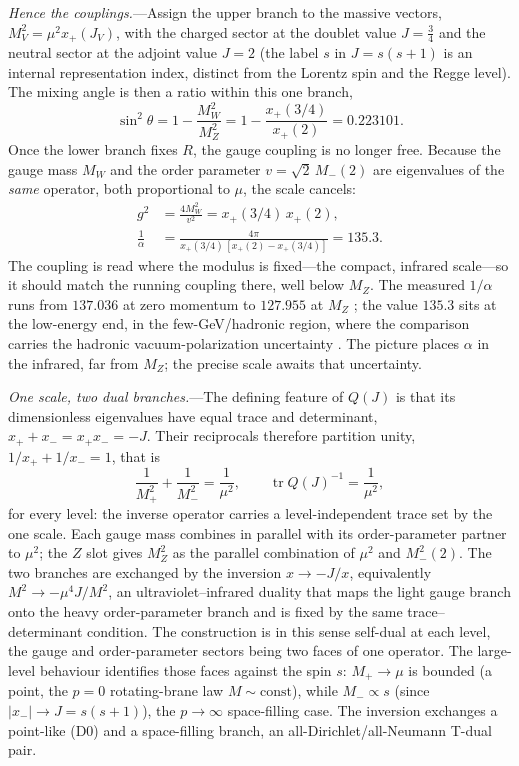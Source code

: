 \documentclass[aps,prl,reprint,superscriptaddress,nofootinbib]{revtex4-2}
\begin{document}
\textit{Hence the couplings.}---Assign the upper branch to the massive vectors,
$M_V^2=\mu^2x_+(J_V)$, with the charged sector at the doublet value $J=\tfrac34$ and the neutral sector
at the adjoint value $J=2$ (the label $s$ in $J=s(s+1)$ is an internal
representation index, distinct from the Lorentz spin and the Regge level). The mixing
angle is then a ratio within this one branch,
\begin{equation}
\sin^2\theta=1-\frac{M_W^2}{M_Z^2}=1-\frac{x_+(3/4)}{x_+(2)}=0.223101 .
\label{eq:sin2}
\end{equation}
Once the lower branch fixes $R$, the gauge coupling is no longer free. Because
the gauge mass $M_W$ and the order parameter $v=\sqrt2\,M_-(2)$ are eigenvalues
of the \emph{same} operator, both proportional to $\mu$, the scale cancels:
\begin{align}
g^2&=\frac{4M_W^2}{v^2}=x_+(3/4)\,x_+(2),\nonumber\\
\frac1\alpha&=\frac{4\pi}{x_+(3/4)\,[x_+(2)-x_+(3/4)]}=135.3 .
\label{eq:alpha}
\end{align}
The coupling is read where the modulus is fixed---the compact, infrared
scale---so it should match the running coupling there, well below $M_Z$. The measured
$1/\alpha$ runs from $137.036$ at zero momentum to $127.955$ at $M_Z$
\cite{PDG2025}; the value $135.3$ sits at the low-energy end, in the
few-GeV/hadronic region, where the comparison carries the hadronic
vacuum-polarization uncertainty \cite{Jegerlehner2019}. The picture places
$\alpha$ in the infrared, far from $M_Z$; the precise scale awaits that
uncertainty.

\textit{One scale, two dual branches.}---The defining feature of $Q(J)$ is that
its dimensionless eigenvalues have equal trace and determinant,
$x_++x_-=x_+x_-=-J$. Their reciprocals therefore partition unity,
$1/x_++1/x_-=1$, that is
\begin{equation}
\frac{1}{M_+^2}+\frac{1}{M_-^2}=\frac1{\mu^2},
\qquad
\operatorname{tr}Q(J)^{-1}=\frac1{\mu^2},
\label{eq:reciprocal}
\end{equation}
for every level: the inverse operator carries a level-independent trace set by
the one scale. Each gauge mass combines in parallel with its order-parameter
partner to $\mu^2$; the $Z$ slot gives $M_Z^2$ as the parallel combination of
$\mu^2$ and $M_-^2(2)$. The two branches are exchanged by the inversion
$x\to-J/x$, equivalently $M^2\to-\mu^4J/M^2$, an ultraviolet--infrared duality
that maps the light gauge branch onto the heavy order-parameter branch and is
fixed by the same trace--determinant condition. The construction is in this sense
self-dual at each level, the gauge and order-parameter sectors being two faces of
one operator. The large-level behaviour identifies those faces against the spin
$s$: $M_+\to\mu$ is bounded (a point, the $p{=}0$ rotating-brane law
$M\sim\text{const}$), while $M_-\propto s$ (since $|x_-|\to J=s(s+1)$), the
$p\to\infty$ space-filling case. The inversion exchanges a point-like (D0) and a
space-filling branch, an all-Dirichlet/all-Neumann T-dual pair.
\end{document}
